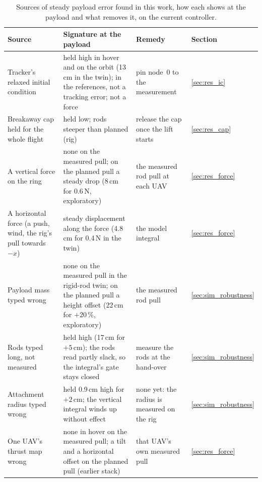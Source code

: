 \begin{table}[htbp]
\centering
\footnotesize
\caption{Sources of steady payload error found in this work, how each shows at the payload and what
removes it, on the current controller.}
\label{tab:error_sources}
\begin{tabularx}{\textwidth}{>{\raggedright\arraybackslash}p{3.2cm}>{\raggedright\arraybackslash}X>{\raggedright\arraybackslash}Xl}
\toprule
Source & Signature at the payload & Remedy & Section \\
\midrule
Tracker's relaxed initial condition & held high in hover and on the orbit (13\,cm in the twin); in the
references, not a tracking error; not a force & pin node~0 to the measurement & \ref{sec:res_ic} \\ \addlinespace
Breakaway cap held for the whole flight & held low; rods steeper than planned (rig) & release the cap once
the lift starts & \ref{sec:res_cap} \\ \addlinespace
A vertical force on the ring & none on the measured pull; on the planned pull a steady drop (8\,cm for 0.6\,N,
exploratory) & the measured rod pull at each UAV & \ref{sec:res_force} \\ \addlinespace
A horizontal force (a push, wind, the rig's pull towards $-x$) & steady displacement along the force (4.8\,cm for
0.4\,N in the twin) & the model integral & \ref{sec:res_force} \\ \addlinespace
Payload mass typed wrong & none on the measured pull in the rigid-rod twin; on the planned pull a height offset
(22\,cm for $+20$\,\%, exploratory) & the measured rod pull & \ref{sec:sim_robustness} \\ \addlinespace
Rods typed long, not measured & held high (17\,cm for $+5$\,cm); the rods read partly slack, so the integral's gate
stays closed & measure the rods at the hand-over & \ref{sec:sim_robustness} \\ \addlinespace
Attachment radius typed wrong & held 0.9\,cm high for $+2$\,cm; the vertical integral winds up without effect &
none yet: the radius is measured on the rig & \ref{sec:sim_robustness} \\ \addlinespace
One UAV's thrust map wrong & none in hover on the measured pull; a tilt and a horizontal offset on the planned
pull (earlier stack) & that UAV's own measured pull & \ref{sec:res_force} \\
\bottomrule
\end{tabularx}
\end{table}

